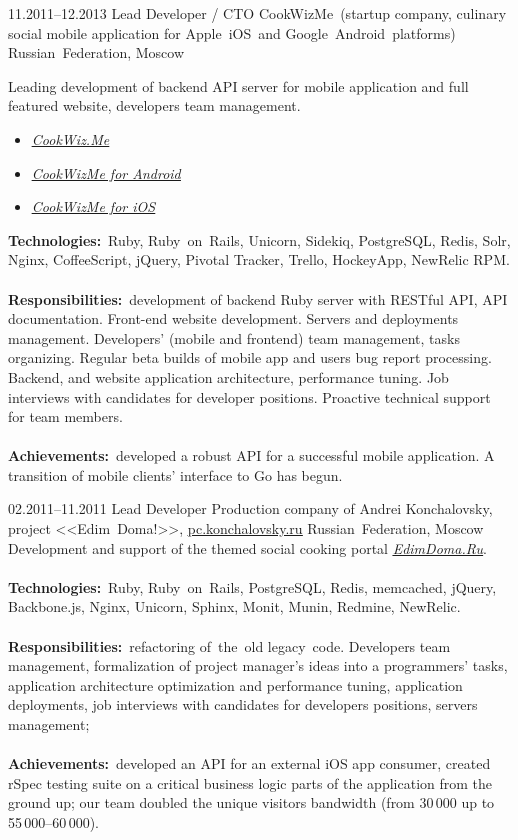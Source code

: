 \documentclass[12pt,a4paper,final]{moderncv}
\begin{document}
\cventry
{11.2011--12.2013}
{Lead Developer / CTO}
{CookWizMe~(startup company, culinary social mobile application for Apple~iOS~and Google~Android~platforms)}
{Russian~Federation, Moscow}
{}
{
  Leading development of backend API server for mobile application and full featured website, developers team management.
  \bigskip
  \begin{itemize}
    \item \underline{\href{https://cookwiz.me/}{\itshape CookWiz.Me}}
    \item \underline{\href{https://play.google.com/store/apps/details?id=com.cookwizme}{\itshape CookWizMe for Android}}
    \item \underline{\href{https://itunes.apple.com/app/id605764643}{\itshape CookWizMe for iOS}}
  \end{itemize}
  \bigskip
  \textbf{Technologies:}~Ruby, Ruby~on~Rails, Unicorn, Sidekiq, PostgreSQL, Redis, Solr, Nginx, CoffeeScript, jQuery, Pivotal Tracker, Trello, HockeyApp, NewRelic RPM.
  \\\\
  \textbf{Responsibilities:}~development of backend Ruby server with RESTful API, API documentation. Front-end website development. Servers and deployments management. Developers' (mobile and frontend) team management, tasks organizing. Regular beta builds of mobile app and users bug report processing. Backend, and website application architecture, performance tuning. Job interviews with candidates for developer positions. Proactive technical support for team members.
  \\\\
  \textbf{Achievements:}~developed a robust API for a successful mobile application. A transition of mobile clients' interface to Go has begun.
}
%
\cventry
{02.2011--11.2011}
{Lead Developer}
{
  Production company of Andrei Konchalovsky, project <<Edim~Doma!>>, \underline{\href{http://pc.konchalovsky.ru}{pc.konchalovsky.ru}}
}
{Russian~Federation, Moscow}
{}
{
  Development and support of the themed social cooking portal \underline{\href{http://www.edimdoma.ru}{\itshape EdimDoma.Ru}}.
  \\\\
  \textbf{Technologies:}~Ruby, Ruby~on~Rails, PostgreSQL, Redis, memcached, jQuery, Backbone.js, Nginx, Unicorn, Sphinx, Monit, Munin, Redmine, NewRelic.
  \\\\
  \textbf{Responsibilities:}~refactoring of~the~old legacy~code. Developers team management, formalization of project manager's ideas into a programmers' tasks, application architecture optimization and performance tuning, application deployments, job interviews with candidates for developers positions, servers management;
  \\\\
  \textbf{Achievements:}~developed an API for an external iOS app consumer, created rSpec testing suite on a critical business logic parts of the application from the ground up; our team doubled the unique visitors bandwidth (from 30\,000 up to 55\,000--60\,000).
}
\end{document}
